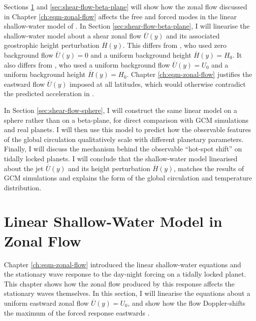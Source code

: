 Sections \ref{sec:shallow-water} and \ref{sec:shear-flow-beta-plane} will show how the zonal flow discussed in Chapter \ref{ch:eqm-zonal-flow} affects the free and forced modes in the linear shallow-water model of \citet{showman2011superrotation}. In Section \ref{sec:shear-flow-beta-plane}, I will linearise the shallow-water model about a shear zonal flow $\overline{U}(y)$ and its associated geostrophic height perturbation $\overline{H}(y)$. This differs from \citet{showman2011superrotation}, who used zero background flow $\overline{U}(y)=0$ and a uniform background height $\overline{H}(y) = H_{0}$. It also differs from \citet{tsai2014three}, who used a uniform background flow $\overline{U}(y)=U_{0}$ and a uniform background height $\overline{H}(y) = H_{0}$.  Chapter \ref{ch:eqm-zonal-flow} justifies the eastward flow $\overline{U}(y)$ imposed at all latitudes, which would otherwise contradict the predicted acceleration in \citet{showman2011superrotation}.

 In Section \ref{sec:shear-flow-sphere}, I will construct the same linear model on a sphere rather than on a beta-plane, for direct comparison with GCM simulations and real planets. I will then use this model to predict how the observable features of the global circulation qualitatively scale with different planetary parameters. Finally, I will discuss the mechanism behind the observable ``hot-spot shift'' on tidally locked planets. I will conclude that the shallow-water model linearised about the jet $\overline{U}(y)$ and its height perturbation $\overline{H}(y)$, matches the results of GCM simulations and explains the form of the global circulation and temperature distribution.


\section{Linear Shallow-Water Model in Zonal Flow}\label{sec:shallow-water}

Chapter \ref{ch:eqm-zonal-flow} introduced the linear shallow-water equations and the stationary wave response to the day-night forcing on a tidally locked planet. This chapter shows how the zonal flow produced by this response affects the stationary waves themselves. In this section, I will linearise the equations about a uniform eastward zonal flow $\overline{U}(y) = U_{0}$, and show how the flow Doppler-shifts the maximum of the forced response eastwards \citep{tsai2014three}.

